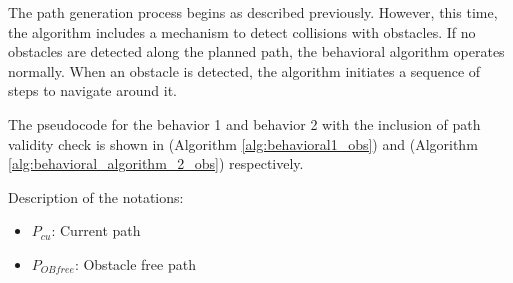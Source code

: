 \vspace*{6mm}  

The path generation process begins as described previously. However, this time, the algorithm includes a mechanism to detect collisions with obstacles. If no obstacles are detected along the planned path, the behavioral algorithm operates normally. When an obstacle is detected, the algorithm initiates a sequence of steps to navigate around it.

\vspace*{6mm}  

The pseudocode for the behavior 1 and behavior 2 with the inclusion of path validity check is shown in (Algorithm \autoref{alg:behavioral1_obs}) and (Algorithm \autoref{alg:behavioral_algorithm_2_obs}) respectively.

\vspace*{6mm}  



Description of the notations:
\begin{itemize}[noitemsep,topsep=0pt]
    \item $P_{cu}$: Current path
    \item $P_{OB free}$: Obstacle free path
\end{itemize}

